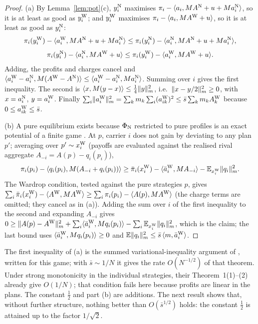 \begin{proof}
(a) By Lemma~\ref{lem:pot}(c), $y_i^{\mathrm{N}}$ maximises $\pi_i-\langle a_i,MA^{\mathrm{N}}+u+Ma_i^{\mathrm{N}}\rangle$, so it is at least as good as $y_i^{\mathrm{W}}$; and $y_i^{\mathrm{W}}$ maximises $\pi_i-\langle a_i,MA^{\mathrm{W}}+u\rangle$, so it is at least as good as $y_i^{\mathrm{N}}$:
\[
\pi_i(y_i^{\mathrm{W}})-\langle a_i^{\mathrm{W}},MA^{\mathrm{N}}+u+Ma_i^{\mathrm{N}}\rangle\le\pi_i(y_i^{\mathrm{N}})-\langle a_i^{\mathrm{N}},MA^{\mathrm{N}}+u+Ma_i^{\mathrm{N}}\rangle,
\]
\[
\pi_i(y_i^{\mathrm{N}})-\langle a_i^{\mathrm{N}},MA^{\mathrm{W}}+u\rangle\le\pi_i(y_i^{\mathrm{W}})-\langle a_i^{\mathrm{W}},MA^{\mathrm{W}}+u\rangle.
\]
Adding, the profits and charges cancel and $\langle a_i^{\mathrm{W}}-a_i^{\mathrm{N}},M(A^{\mathrm{W}}-A^{\mathrm{N}})\rangle\le\langle a_i^{\mathrm{W}}-a_i^{\mathrm{N}},Ma_i^{\mathrm{N}}\rangle$. Summing over $i$ gives the first inequality. The second is $\langle x,M(y-x)\rangle\le\tfrac14\lVert y\rVert_m^2$, i.e.\ $\lVert x-y/2\rVert_m^2\ge0$, with $x=a_i^{\mathrm{N}}$, $y=a_i^{\mathrm{W}}$. Finally $\sum_i\lVert a_i^{\mathrm{W}}\rVert_m^2=\sum_km_k\sum_i(a_{ik}^{\mathrm{W}})^2\le\bar s\sum_km_kA_k^{\mathrm{W}}$ because $0\le a_{ik}^{\mathrm{W}}\le\bar s$.

(b) A pure equilibrium exists because $\Phi_{\mathrm{N}}$ restricted to pure profiles is an exact potential of a finite game \citep{Monderer1996}. At $p$, carrier $i$ does not gain by deviating to any plan $p'$; averaging over $p'\sim x_i^{\mathrm{W}}$ (payoffs are evaluated against the realised rival aggregate $A_{-i}=A(p)-q_i(p_i)$),
\[
\pi_i(p_i)-\langle q_i(p_i),M(A_{-i}+q_i(p_i))\rangle\ge\bar\pi_i(x_i^{\mathrm{W}})-\langle \bar a_i^{\mathrm{W}},MA_{-i}\rangle-\mathbb{E}_{x_i^{\mathrm{W}}}\lVert q_i\rVert_m^2 .
\]
The Wardrop condition, tested against the pure strategies $p$, gives $\sum_i\bar\pi_i(x_i^{\mathrm{W}})-\langle A^{\mathrm{W}},MA^{\mathrm{W}}\rangle\ge\sum_i\pi_i(p_i)-\langle A(p),MA^{\mathrm{W}}\rangle$ (the charge terms are omitted; they cancel as in (a)). Adding the sum over $i$ of the first inequality to the second and expanding $A_{-i}$ gives
$0\ge\lVert A(p)-A^{\mathrm{W}}\rVert_m^2+\sum_i\langle \bar a_i^{\mathrm{W}},Mq_i(p_i)\rangle-\sum_i\mathbb{E}_{x_i^{\mathrm{W}}}\lVert q_i\rVert_m^2$, which is the claim; the last bound uses $\langle \bar a_i^{\mathrm{W}},Mq_i(p_i)\rangle\ge0$ and $\mathbb{E}\lVert q_i\rVert_m^2\le\bar s\,\langle m,\bar a_i^{\mathrm{W}}\rangle$.
\end{proof}

The first inequality of (a) is the summed variational-inequality argument of \citet[Thm.~1(3)]{Paccagnan2019}, written for this game; with $\bar s\sim1/N$ it gives the rate $O(N^{-1/2})$ of that theorem. Under strong monotonicity in the individual strategies, their Theorem~1(1)--(2) already give $O(1/N)$; that condition fails here because profits are linear in the plans. The constant $\tfrac12$ and part (b) are additions. The next result shows that, without further structure, nothing better than $O(\bar s^{1/2})$ holds: the constant $\tfrac12$ is attained up to the factor $1/\sqrt2$.

